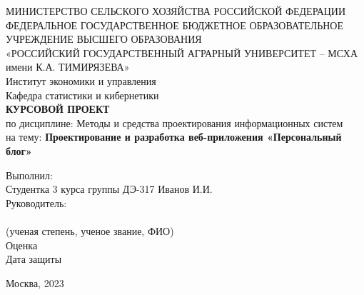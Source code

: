 \documentclass[a4paper,14pt]{extarticle}
\begin{document}
\begin{titlepage}
\begin{center}
\small
МИНИСТЕРСТВО СЕЛЬСКОГО ХОЗЯЙСТВА РОССИЙСКОЙ ФЕДЕРАЦИИ\\
ФЕДЕРАЛЬНОЕ ГОСУДАРСТВЕННОЕ БЮДЖЕТНОЕ ОБРАЗОВАТЕЛЬНОЕ УЧРЕЖДЕНИЕ ВЫСШЕГО ОБРАЗОВАНИЯ\\
«РОССИЙСКИЙ ГОСУДАРСТВЕННЫЙ АГРАРНЫЙ УНИВЕРСИТЕТ – МСХА имени К.А. ТИМИРЯЗЕВА»\\
Институт экономики и управления\\
Кафедра статистики и кибернетики\\[2cm]

\large
\textbf{КУРСОВОЙ ПРОЕКТ}\\
\normalsize
по дисциплине: Методы и средства проектирования информационных систем\\
на тему: \textbf{Проектирование и разработка веб-приложения «Персональный блог»}\\[2cm]
\end{center}

\begin{flushright}
Выполнил:\\
Студентка 3 курса группы ДЭ-317 Иванов И.И.\\[0.8cm]
Руководитель:\\
\underline{\hspace{5cm}}\\
(ученая степень, ученое звание, ФИО)\\[0.8cm]
Оценка \underline{\hspace{4cm}}\\
Дата защиты \underline{\hspace{3.4cm}}
\end{flushright}

\vfill
\begin{center}
Москва, 2023
\end{center}
\end{titlepage}
\end{document}
